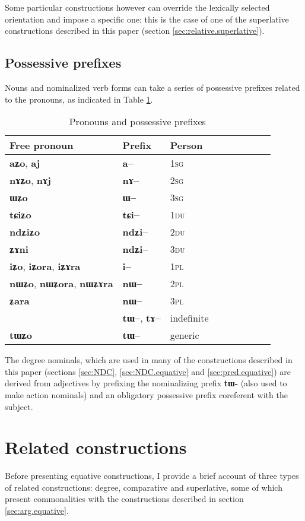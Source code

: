 \documentclass[oneside,a4paper,11pt]{article}
\newcommand{\ipa}[1]{{\phon\textbf{#1}}}
\begin{document}
Some particular constructions however can override the lexically selected orientation and impose a specific one; this is the case of one of the superlative constructions described in this paper (section \ref{sec:relative.superlative}).

\subsection{Possessive prefixes} \label{sec:possessive}
Nouns and nominalized verb forms can take a series of possessive prefixes related to the pronouns, as indicated in Table \ref{tab:pronoun}. 


\begin{table}[H] \centering
\caption{Pronouns and possessive prefixes }\label{tab:pronoun}
\begin{tabular}{lllllllll} 
\toprule
 Free pronoun & Prefix & Person\\
\midrule
 \ipa{aʑo},    \ipa{aj} &	\ipa{a--}  &		1\textsc{sg} \\
\ipa{nɤʑo},  \ipa{nɤj} &	\ipa{nɤ--}  &			2\textsc{sg}\\
\ipa{ɯʑo}  &	\ipa{ɯ--}  &			3\textsc{sg}\\
\midrule
\ipa{tɕiʑo}  &	\ipa{tɕi--}  &			1\textsc{du} \\
\ipa{ndʑiʑo}  &	\ipa{ndʑi--}  &		2\textsc{du} \\	
\ipa{ʑɤni}  &	\ipa{ndʑi--}  &		3\textsc{du} \\	
\midrule
\ipa{iʑo}, \ipa{iʑora},   \ipa{iʑɤra}   &	\ipa{i--}  &			1\textsc{pl} \\
\ipa{nɯʑo}, \ipa{nɯʑora},   \ipa{nɯʑɤra}  &	\ipa{nɯ--}  &			2\textsc{pl} \\
\ipa{ʑara}  &	\ipa{nɯ--}  &			3\textsc{pl} \\
\midrule
&  \ipa{tɯ--},  \ipa{tɤ--} & indefinite \\
\ipa{tɯʑo} & \ipa{tɯ--}   &  generic\\
\bottomrule
\end{tabular}
\end{table}

The degree nominals, which are used in many of the constructions described in this paper (sections \ref{sec:NDC}, \ref{sec:NDC.equative} and \ref{sec:pred.equative}) are derived from adjectives by prefixing the nominalizing prefix \ipa{tɯ-} (also used to make action nominals) and an obligatory possessive prefix coreferent with the subject.

\section{Related constructions}
Before presenting equative constructions, I provide a brief account of three types of related constructions: degree, comparative and superlative, some of which present commonalities with the constructions described in section \ref{sec:arg.equative}.
\end{document}
